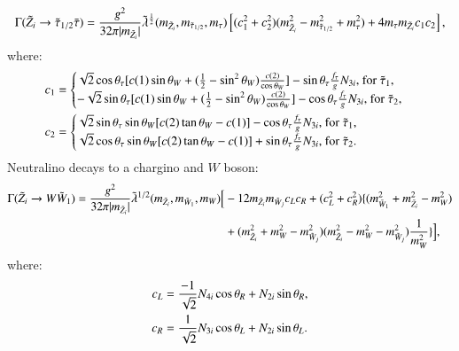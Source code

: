\documentclass[final,3p,times,pdflatex]{elsarticle}
\begin{document}
\begin{equation} \label{neutstautauNMSSM}
\Gamma(\tilde{Z}_i \rightarrow \tilde{\tau}_{1/2} \bar{\tau}) = {g^2 \over 32\pi |m_{\tilde{Z}_i}|} \tilde{\lambda}^{1 \over 2}(m_{\tilde{Z}_i},m_{\tilde{\tau}_{1/2}}, m_{\tau})\left[(c_{1}^2 + c_{2}^2)(m_{\tilde{Z}_i}^2 - m_{\tilde{\tau}_{1/2}}^2 + m_{\tau}^2) + 4m_{\tau}m_{\tilde{Z}_i}c_{1}c_{2}\right],
\end{equation}
where:
\begin{align}
c_{1} &= \begin{cases}
		\sqrt{2}\cos\theta_{\tau}[c(1) \sin\theta_W + ({1 \over 2} - \sin^2 \theta_W){c(2) \over \cos\theta_W}] - \sin\theta_{\tau} {f_{\tau} \over g} N_{3i} $, for $\tilde{\tau}_1$,$ \\
		-\sqrt{2}\sin\theta_{\tau}[c(1) \sin\theta_W + ({1 \over 2} - \sin^2 \theta_W){c(2) \over \cos\theta_W}] - \cos\theta_{\tau} {f_{\tau} \over g}N_{3i} $, for $\tilde{\tau}_2$,$ \\
		\end{cases} \\
c_{2} &= \begin{cases}
		\sqrt{2}\sin\theta_{\tau}\sin\theta_W [c(2)\tan\theta_W - c(1)] - \cos\theta_{\tau} {f_{\tau} \over g} N_{3i} $, for $\tilde{\tau}_1$,$ \\
		\sqrt{2}\cos\theta_\tau \sin\theta_W [c(2)\tan\theta_W - c(1)] + \sin\theta_{\tau} {f_{\tau} \over g} N_{3i} $, for $\tilde{\tau}_2. \\
		\end{cases}
\end{align}
Neutralino decays to a chargino and $W$ boson:
\begin{equation} \label{neutWchNMSSM}
\begin{aligned}
\Gamma(\tilde{Z}_i \rightarrow W \tilde{W}_{1}) = {g^2 \over 32\pi |m_{\tilde{Z}_i}|} \tilde{\lambda}^{1/2}(m_{\tilde{Z}_i},m_{\tilde{W}_1},m_{W})\Big[& -12m_{\tilde{Z}_i} m_{\tilde{W}_j}c_{L}c_{R} + (c_{L}^2 + c_{R}^2)\{(m_{\tilde{W}_1}^2 + m_{\tilde{Z}_i}^2 - m_{W}^2) \\ & + (m_{\tilde{Z}_i}^2 + m_{W}^2 - m_{\tilde{W}_j}^2)(m_{\tilde{Z}_i}^2 - m_{W}^2 - m_{\tilde{W}_j}^2){1 \over m_{W}^2} \} \Big],
\end{aligned}
\end{equation}
where:
\begin{align}
c_{L} &= {-1 \over \sqrt{2}} N_{4i} \cos\theta_R + N_{2i}\sin\theta_R, \\  
c_{R} &= {1 \over \sqrt{2}} N_{3i} \cos\theta_L + N_{2i}\sin\theta_L.
\end{align}
\end{document}
